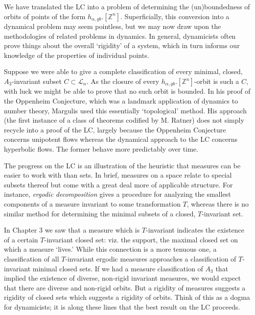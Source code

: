 \documentclass[12pt, letterpaper, oneside]{book}
\newcommand{\ga}{\ensuremath{\alpha}}
\newcommand{\Z}{\mathbb{Z}}
\theoremstyle{plain}
\theoremstyle{definition}
\theoremstyle{remark}
\begin{document}
We have translated the LC into a problem of determining the (un)boundedness of orbits of points of the form $h_{\ga, gb}.[\Z^n]$. Superficially, this conversion into a dynamical problem may seem pointless, but we may now draw upon the methodologies of related problems in dynamics. In general, dynamicists often prove things about the overall `rigidity' of a system, which in turn informs our knowledge of the properties of individual points. 

Suppose we were able to give a complete classification of every minimal, closed, $A_3$-invariant subset $C \subset \mathcal{L}_n.$ As the closure of every $h_{\ga, gb}.[\Z^n]$-orbit is such a $C,$ with luck we might be able to prove that no such orbit is bounded. In his proof of the Oppenheim Conjecture, which was a landmark application of dynamics to number theory, Margulis used this essentially `topological' method. His approach (the first instance of a class of theorems codified by M. Ratner) does not simply recycle into a proof of the LC, largely because the Oppenheim Conjecture concerns unipotent flows whereas the dynamical approach to the LC concerns hyperbolic flows. The former behave more predictably over time.

The progress on the LC is an illustration of the heuristic that measures can be easier to work with than sets. In brief, measures on a space relate to special subsets thereof but come with a great deal more of applicable structure. For instance, \textit{ergodic decomposition} gives a procedure for analyzing the smallest components of a measure invariant to some transformation $T$, whereas there is no similar method for determining the minimal subsets of a closed, $T$-invariant set. 

In Chapter 3 we saw that a measure which is $T$-invariant indicates the existence of a certain $T$-invariant closed set: viz. the support, the maximal closed set on which a measure `lives.' While this connection is a more tenuous one, a classification of all $T$-invariant ergodic measures approaches a classification of $T$-invariant minimal closed sets. If we had a measure classification of $A_3$ that implied the existence of diverse, non-rigid invariant measures, we would expect that there are diverse and non-rigid orbits. But a rigidity of measures suggests a rigidity of closed sets which suggests a rigidity of orbits. Think of this as a dogma for dynamicists; it is along these lines that the best result on the LC proceeds. 
\end{document}
